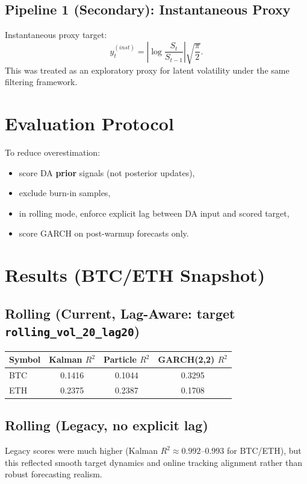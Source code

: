 \documentclass[10pt]{article}
\begin{document}
\subsection{Pipeline 1 (Secondary): Instantaneous Proxy}
Instantaneous proxy target:
\begin{equation}
y_t^{(inst)}=\left|\log\frac{S_t}{S_{t-1}}\right|\sqrt{\frac{\pi}{2}}.
\end{equation}
This was treated as an exploratory proxy for latent volatility under the same filtering framework.

\section{Evaluation Protocol}
To reduce overestimation:
\begin{itemize}[leftmargin=1.2em]
  \item score DA \textbf{prior} signals (not posterior updates),
  \item exclude burn-in samples,
  \item in rolling mode, enforce explicit lag between DA input and scored target,
  \item score GARCH on post-warmup forecasts only.
\end{itemize}

\section{Results (BTC/ETH Snapshot)}
\subsection{Rolling (Current, Lag-Aware: target \texttt{rolling\_vol\_20\_lag20})}
\begin{table}[h]
\centering
\begin{tabular}{lccc}
\toprule
Symbol & Kalman $R^2$ & Particle $R^2$ & GARCH(2,2) $R^2$ \\
\midrule
BTC & 0.1416 & 0.1044 & 0.3295 \\
ETH & 0.2375 & 0.2387 & 0.1708 \\
\bottomrule
\end{tabular}
\end{table}

\subsection{Rolling (Legacy, no explicit lag)}
Legacy scores were much higher (Kalman $R^2\approx0.992$--$0.993$ for BTC/ETH), but this reflected smooth target dynamics and online tracking alignment rather than robust forecasting realism.
\end{document}
